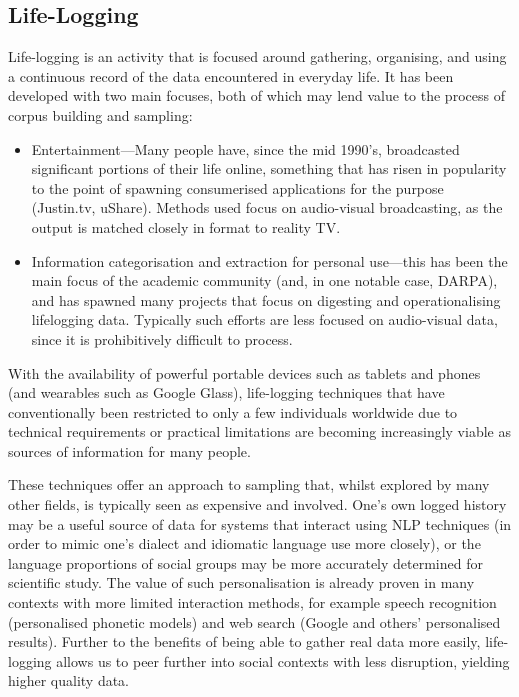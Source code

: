 

\subsection{Life-Logging}
Life-logging is an activity that is focused around gathering, organising, and using a continuous record of the data encountered in everyday life.  It has been developed with two main focuses, both of which may lend value to the process of corpus building and sampling:

\begin{itemize}
    \item Entertainment---Many people have, since the mid 1990's, broadcasted significant portions of their life online, something that has risen in popularity to the point of spawning consumerised applications for the purpose (Justin.tv, uShare).  Methods used focus on audio-visual broadcasting, as the output is matched closely in format to reality TV.
    \item Information categorisation and extraction for personal use---this has been the main focus of the academic community (and, in one notable case, DARPA\cite{allen2008dredging}), and has spawned many projects that focus on digesting and operationalising lifelogging data.  Typically such efforts are less focused on audio-visual data, since it is prohibitively difficult to process.
\end{itemize}


With the availability of powerful portable devices such as tablets and phones (and wearables such as Google Glass), life-logging techniques that have conventionally been restricted to only a few individuals worldwide due to technical requirements or practical limitations are becoming increasingly viable as sources of information for many people.

These techniques offer an approach to sampling that, whilst explored by many other fields, is typically seen as expensive and involved.  One's own logged history may be a useful source of data for systems that interact using NLP techniques (in order to mimic one's dialect and idiomatic language use more closely), or the language proportions of social groups may be more accurately determined for scientific study.  The value of such personalisation is already proven in many contexts with more limited interaction methods, for example speech recognition (personalised phonetic models) and web search (Google and others' personalised results).  Further to the benefits of being able to gather real data more easily, life-logging allows us to peer further into social contexts with less disruption, yielding higher quality data.

